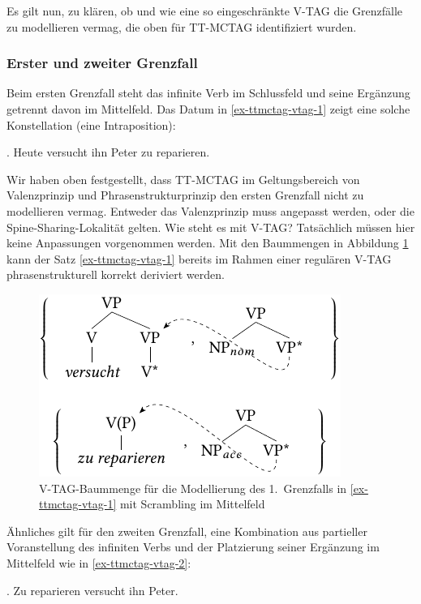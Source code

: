 Es gilt nun, zu klären, ob und wie eine so eingeschränkte V-TAG die Grenzfälle zu modellieren vermag, die oben für TT-MCTAG identifiziert wurden.


\subsubsection*{Erster und zweiter Grenzfall}

Beim ersten Grenzfall steht das infinite Verb im Schlussfeld und seine Ergänzung getrennt davon im Mittelfeld. Das Datum in \ref{ex-ttmctag-vtag-1} zeigt eine solche Konstellation (eine Intraposition):

\ex. Heute versucht ihn Peter zu reparieren. \label{ex-ttmctag-vtag-1}

Wir haben oben festgestellt, dass TT-MCTAG im Geltungsbereich von Valenzprinzip und Phrasenstrukturprinzip den ersten Grenzfall nicht zu modellieren vermag. Entweder das Valenzprinzip muss angepasst werden, oder die Spine-Sharing-Lokalität gelten. Wie steht es mit V-TAG? Tatsächlich müssen hier keine Anpassungen vorgenommen werden. Mit den Baummengen in Abbildung \ref{fig-ttmctag-vtag-1} kann der Satz \ref{ex-ttmctag-vtag-1} bereits im Rahmen einer regulären V-TAG phrasenstrukturell korrekt deriviert werden.

\begin{figure}[t]
\centering
\includegraphics{graphics/abb741.pdf}
\caption{\label{fig-ttmctag-vtag-1}V-TAG-Baummenge für die Modellierung des 1.~Grenzfalls in \ref{ex-ttmctag-vtag-1} mit Scrambling im Mittelfeld}
\end{figure}

Ähnliches gilt für den zweiten Grenzfall, eine Kombination aus partieller Voranstellung des infiniten Verbs und der Platzierung seiner Ergänzung im Mittelfeld wie in \ref{ex-ttmctag-vtag-2}:

\ex. Zu reparieren versucht ihn Peter. \label{ex-ttmctag-vtag-2}

